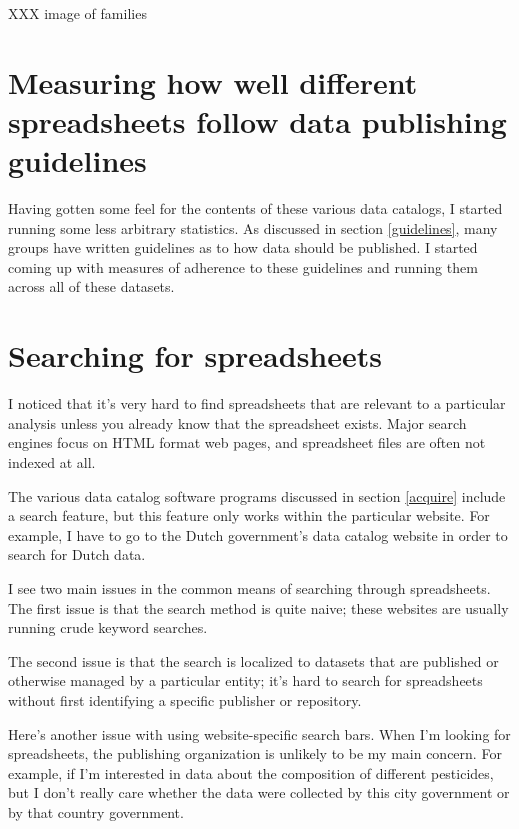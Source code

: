 \documentclass{acm_proc_article-sp}
\begin{document}
XXX image of families




\section{Measuring how well different spreadsheets follow data publishing guidelines}
Having gotten some feel for the contents of these various data catalogs,
I started running some less arbitrary statistics.
As discussed in section \ref{guidelines}, many groups have written guidelines
as to how data should be published.
\cite{open-data-census,fivestars,sunlight,sebastopol,odi}
I started coming up with measures of adherence to these guidelines and running
them across all of these datasets.










\section{Searching for spreadsheets}
I noticed that it's very hard to find spreadsheets that are relevant
to a particular analysis unless you already know that the spreadsheet exists.
Major search engines focus on HTML format web pages, and spreadsheet files
are often not indexed at all.

The various data catalog software programs
discussed in section \ref{acquire} include a search feature, but this feature
only works within the particular website. For example, I have to go to the
Dutch government's data catalog website in order to search for Dutch data.

I see two main issues in the common means of searching through spreadsheets.
The first issue is that the search method is quite naive; these websites are
usually running crude keyword searches.

The second issue is that the search is localized to datasets that are published
or otherwise managed by a particular entity; it's hard to search for
spreadsheets without first identifying a specific publisher or repository.

Here's another issue with using website-specific search bars.
When I'm looking for spreadsheets, the publishing organization is unlikely
to be my main concern. For example, if I'm interested in data about the
composition of different pesticides, but I don't really care whether the
data were collected by this city government or by that country government.
\end{document}

